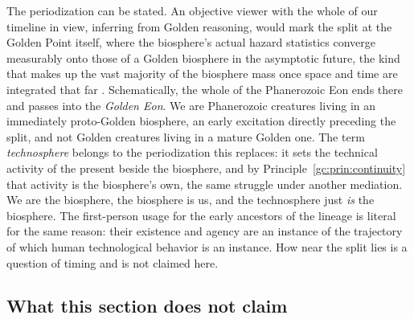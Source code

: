 \begin{remark}
The periodization can be stated. An objective viewer with the whole of
our timeline in view, inferring from Golden reasoning, would mark the
split at the Golden Point itself, where the biosphere's actual hazard
statistics converge measurably onto those of a Golden biosphere in the
asymptotic future, the kind that makes up the vast majority of the
biosphere mass once space and time are integrated that far
\cite{GoldenReasoning}. Schematically, the whole of the Phanerozoic Eon
ends there and passes into the \emph{Golden Eon}. We are Phanerozoic
creatures living in an immediately proto-Golden biosphere, an early
excitation directly preceding the split, and not Golden creatures
living in a mature Golden one. The term \emph{technosphere} belongs to
the periodization this replaces: it sets the technical activity of the
present beside the biosphere, and by Principle~\ref{gc:prin:continuity}
that activity is the biosphere's own, the same struggle under another
mediation. We are the biosphere, the biosphere is us, and the
technosphere just \emph{is} the biosphere. The first-person usage for
the early ancestors of the lineage is literal for the same reason:
their existence and agency are an instance of the trajectory of which
human technological behavior is an instance. How near the split lies
is a question of timing and is not claimed here.
\end{remark}



\subsection{What this section does not claim}\label{gr:sub:fence}

